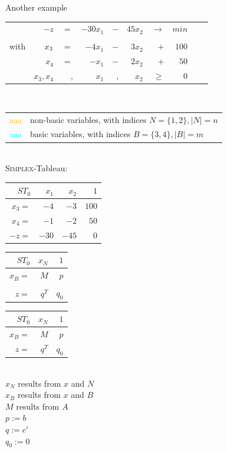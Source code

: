 \documentclass[10pt]{beamer}
\begin{document}
\begin{frame}[fragile]{}
	\begin{exampleblock}{Another example}
	\begin{tabular}{rrrrrrrrrr}
		&$ -z $&$=$& $-30x_1$ &$-$&$45x_2$ &$\rightarrow$& \textbf{$min$}&& \\
		\\
		with&$\cellcolor{cyan}x_3$&$=$&$-4x_1$ &$-$&$3x_2$&$+$&$100$&&\\
		&\cellcolor{cyan}$x_4$&$=$&$-x_1$ & $-$&$2x_2$&$+$&$50$&&\\
		&$x_3,x_4$&,&\cellcolor{orange}$x_1$ &, &\cellcolor{orange}$x_2$&$\geq$&$0$
	\end{tabular} \\
	\vspace{0.5cm}
	\begin{tabular}{ll}
		\cellcolor{orange}\textcolor{orange}{aaa} & non-basic variables, with indices $N = \{1,2\}, |N| = n$\\
		\cellcolor{cyan}\textcolor{cyan}{aaa}& basic variables, with indices $B = \{3, 4\}, |B| = m$
	\end{tabular}\\

	\vspace{0.5cm}
	\textsc{Simplex}-Tableau: %
	\begingroup
	\def\arraystretch{1.5}
	\begin{tabular}{r|rr|r}
		$ST_0$&$x_1$&$x_2$&$1$\\
		\hline
		$x_3=$&$-4$&$-3$&$100$\\
		$x_4=$&$-1$&$-2$&$50$\\
		\hline
		$-z=$&$-30$&$-45$&$0$
	\end{tabular}
	\endgroup
	\begingroup
	\def\arraystretch{1.5}
	\begin{tabular}{r|r|r}
		$ST_0$&$x_N$&$1$\\
		\hline
		$x_B=$&$M$&$p$\\
		&&\\
		\hline
		$z=$&$q^T$&$q_0$
	\end{tabular}
	\endgroup
	\end{exampleblock}
\end{frame}

\begin{frame}{}
	\begingroup
	\def\arraystretch{1.5}
	\begin{tabular}{r|r|r}
		$ST_0$&$x_N$&$1$\\
		\hline
		$x_B=$&$M$&$p$\\
		\hline
		$z=$&$q^T$&$q_0$
	\end{tabular}
	\endgroup \\
	\vspace{0.25cm}
	$ x_N $ results from $ x $ and $ N $ \\
	$ x_B $ results from  $ x $ and $ B $ \\ 
	$M$ results from $A$ \\
	$p:=b$ \\
	$ q := c' $\\
	$ q_0:=0$ \\
	\vspace{0.25cm}
\end{frame}
\end{document}
